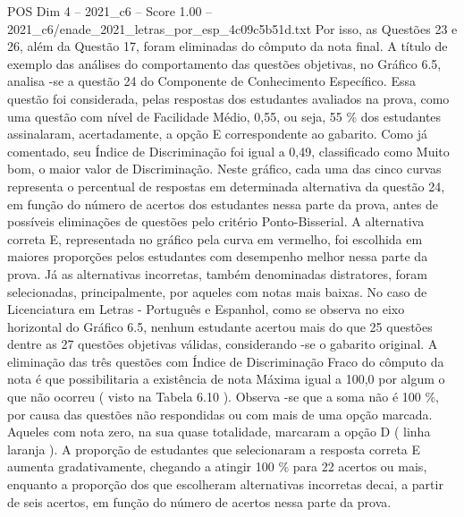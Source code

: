 \begin{textsample}{POS Dim 4 – 2021\_c6 – Score 1.00 – 2021\_c6/enade\_2021\_letras\_por\_esp\_4c09c5b51d.txt}
Por isso, as Questões 23 e 26, além da Questão 17, foram eliminadas do cômputo da nota final.
A título de exemplo das análises do comportamento das questões objetivas, no Gráfico 6.5, analisa -se a questão 24 do Componente de Conhecimento Específico.
Essa questão foi considerada, pelas respostas dos estudantes avaliados na prova, como uma questão com nível de Facilidade Médio, 0,55, ou seja, 55 \% dos estudantes assinalaram, acertadamente, a opção E correspondente ao gabarito.
Como já comentado, seu Índice de Discriminação foi igual a 0,49, classificado como Muito bom, o maior valor de Discriminação.
Neste gráfico, cada uma das cinco curvas representa o percentual de respostas em determinada alternativa da questão 24, em função do número de acertos dos estudantes nessa parte da prova, antes de possíveis eliminações de questões pelo critério Ponto-Bisserial.
A alternativa correta E, representada no gráfico pela curva em vermelho, foi escolhida em maiores proporções pelos estudantes com desempenho melhor nessa parte da prova.
Já as alternativas incorretas, também denominadas distratores, foram selecionadas, principalmente, por aqueles com notas mais baixas.
No caso de Licenciatura em Letras - Português e Espanhol, como se observa no eixo horizontal do Gráfico 6.5, nenhum estudante acertou mais do que 25 questões dentre as 27 questões objetivas válidas, considerando -se o gabarito original.
A eliminação das três questões com Índice de Discriminação Fraco do cômputo da nota é que possibilitaria a existência de nota Máxima igual a 100,0 por algum o que não ocorreu ( visto na Tabela 6.10 ).
Observa -se que a soma não é 100 \%, por causa das questões não respondidas ou com mais de uma opção marcada.
Aqueles com nota zero, na sua quase totalidade, marcaram a opção D ( linha laranja ).
A proporção de estudantes que selecionaram a resposta correta E aumenta gradativamente, chegando a atingir 100 \% para 22 acertos ou mais, enquanto a proporção dos que escolheram alternativas incorretas decai, a partir de seis acertos, em função do número de acertos nessa parte da prova.

\end{textsample}
